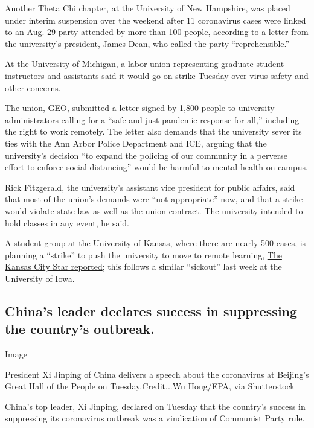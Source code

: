 Another Theta Chi chapter, at the University of New Hampshire, was
placed under interim suspension over the weekend after 11 coronavirus
cases were linked to an Aug. 29 party attended by more than 100 people,
according to a
\href{https://www.unh.edu/president/president-dean-condemns-covid-cluster-theta-chi-fraternity}{letter
from the university's president, James Dean}, who called the party
``reprehensible.''

At the University of Michigan, a labor union representing
graduate-student instructors and assistants said it would go on strike
Tuesday over virus safety and other concerns.

The union, GEO, submitted a letter signed by 1,800 people to university
administrators calling for a ``safe and just pandemic response for
all,'' including the right to work remotely. The letter also demands
that the university sever its ties with the Ann Arbor Police Department
and ICE, arguing that the university's decision ``to expand the policing
of our community in a perverse effort to enforce social distancing''
would be harmful to mental health on campus.

Rick Fitzgerald, the university's assistant vice president for public
affairs, said that most of the union's demands were ``not appropriate''
now, and that a strike would violate state law as well as the union
contract. The university intended to hold classes in any event, he said.

A student group at the University of Kansas, where there are nearly 500
cases, is planning a ``strike'' to push the university to move to remote
learning,
\href{https://www.kansascity.com/news/coronavirus/article245534890.html}{The
Kansas City Star reported}; this follows a similar ``sickout'' last week
at the University of Iowa.

\hypertarget{chinas-leader-declares-success-in-suppressing-the-countrys-outbreak}{%
\subsection{China's leader declares success in suppressing the country's
outbreak.}\label{chinas-leader-declares-success-in-suppressing-the-countrys-outbreak}}

Image

President Xi Jinping of China delivers a speech about the coronavirus at
Beijing's Great Hall of the People on Tuesday.Credit...Wu Hong/EPA, via
Shutterstock

China's top leader, Xi Jinping, declared on Tuesday that the country's
success in suppressing its coronavirus outbreak was a vindication of
Communist Party rule.

